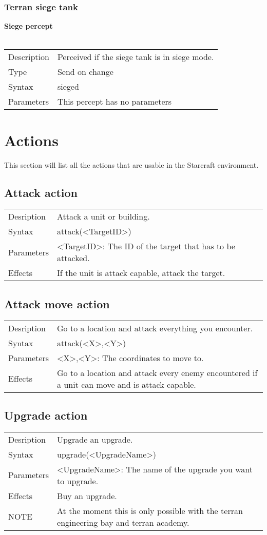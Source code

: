 \documentclass[english,11pt]{report}
\begin{document}
\subsection{Terran siege tank}
\textbf{Siege percept}\\
\\
\begin{tabularx}{\textwidth}{lX}
 Description & Perceived if the siege tank is in siege mode. \\
 Type & Send on change \\
 Syntax & sieged \\
 Parameters &   This percept has no parameters
\end{tabularx}

\chapter{Actions}
This section will list all the actions that are usable in the Starcraft environment.

\section{Attack action}
\begin{tabularx}{\textwidth}{lX}
 Desription & Attack a unit or building. \\
 Syntax & attack(<TargetID>) \\
 Parameters & <TargetID>: The ID of the target that has to be attacked.\\
 Effects &  If the unit is attack capable, attack the target.
\end{tabularx}

\section{Attack move action}
\begin{tabularx}{\textwidth}{lX}
 Desription & Go to a location and attack everything you encounter. \\
 Syntax & attack(<X>,<Y>) \\
 Parameters & <X>,<Y>: The coordinates to move to.\\
 Effects &  Go to a location and attack every enemy encountered if a unit can move and is attack capable.
\end{tabularx}

\section{Upgrade action}
\begin{tabularx}{\textwidth}{lX}
 Desription & Upgrade an upgrade. \\
 Syntax & upgrade(<UpgradeName>) \\
 Parameters & <UpgradeName>: The name of the upgrade you want to upgrade.\\
 Effects &  Buy an upgrade.\\
 NOTE & At the moment this is only possible with the terran engineering bay and terran academy.
\end{tabularx}
\end{document}
